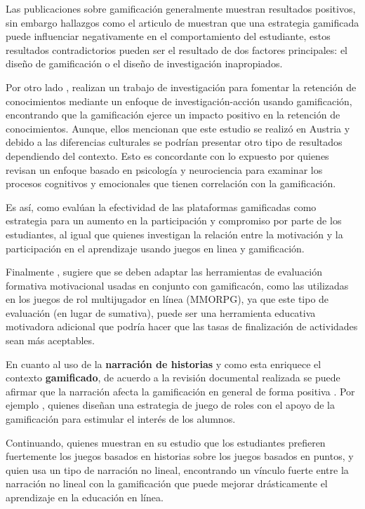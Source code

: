 Las publicaciones sobre gamificación generalmente muestran resultados positivos, sin embargo hallazgos
como el articulo de  muestran que una estrategia gamificada puede influenciar negativamente
en el comportamiento del estudiante, estos resultados contradictorios pueden ser el resultado de dos factores 
principales: el diseño de gamificación o el diseño de investigación inapropiados.

Por otro lado , realizan un trabajo de investigación para fomentar la retención de 
conocimientos mediante un enfoque de investigación-acción usando gamificación, encontrando que la gamificación 
ejerce un impacto positivo en la retención de conocimientos. Aunque, ellos mencionan que
este estudio se realizó en Austria y debido a las diferencias culturales se podrían presentar otro tipo de
resultados dependiendo del contexto. Esto es concordante con lo expuesto por  quienes 
revisan un enfoque basado en psicología y neurociencia para examinar los procesos cognitivos y emocionales que
tienen correlación con la gamificación.

Es así, como  evalúan la efectividad de las plataformas gamificadas como estrategia 
para un aumento en la participación y compromiso por parte de los estudiantes, al igual que 
 quienes investigan la relación entre la motivación y la participación en el 
aprendizaje usando juegos en linea y gamificación.


Finalmente , sugiere que se deben adaptar las herramientas de evaluación formativa 
motivacional usadas en conjunto con gamificacón, como las utilizadas en los juegos de rol multijugador en 
línea (MMORPG), ya que este tipo de evaluación (en lugar de sumativa), puede ser una herramienta educativa 
motivadora adicional que podría hacer que las tasas de finalización de actividades sean más aceptables.


En cuanto al uso de la \textbf{narración de historias} y como esta enriquece el contexto \textbf{gamificado}, 
de acuerdo a la revisión documental realizada se puede afirmar que la narración afecta la gamificación en 
general de forma positiva \cite{articleGiakalaras}. Por ejemplo , quienes diseñan una estrategia 
de juego de roles con el apoyo de la gamificación para estimular el interés de los alumnos.

Continuando,  quienes muestran en su estudio que los estudiantes prefieren 
fuertemente los juegos basados en historias sobre los juegos basados en puntos, y  quien usa
un tipo de narración no lineal, encontrando un vínculo fuerte entre la narración no lineal con la gamificación
que puede mejorar drásticamente el aprendizaje en la educación en línea.


